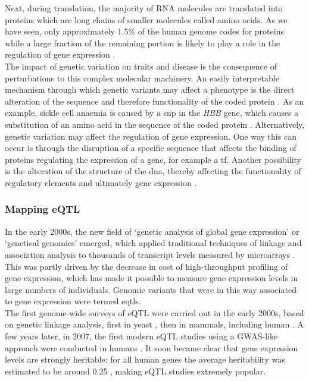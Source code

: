 Next, during translation, the majority of RNA molecules are translated into  proteins 
which are
long chains of smaller molecules called amino acids. 
As we have seen, only approximately 1.5\% of the human genome codes for proteins \cite{lander2001initial} while a large fraction of the remaining portion is likely to play a role in the regulation of gene expression \cite{encode2004encode}. \\

The impact of genetic variation on traits and disease is the consequence of perturbations to this complex molecular machinery.
An easily interpretable mechanism through which genetic variants may affect a phenotype is the direct alteration of the sequence 
and therefore functionality of the coded protein \cite{westra2014genome}. 
As an example, sickle cell anaemia is caused by a \gls{snp} in the \textit{HBB} gene, which causes a substitution of an amino acid in the sequence of the coded protein \cite{laird2010fundamentals}. 
Alternatively, genetic variation may affect the regulation of gene expression. 
One way this can occur is through the disruption of a specific sequence that affects the binding of proteins regulating the expression of a gene, for example a \gls{tf}. 
Another possibility is the alteration of the structure of the \gls{dna}, thereby affecting the functionality of regulatory elements and ultimately gene expression \cite{encode2004encode, kundaje2015integrative}. 

\subsubsection{Mapping eQTL}

In the early 2000s, the new field of `genetic analysis of global gene expression' or `genetical genomics' \cite{jansen2001genetical} emerged, which applied traditional techniques of linkage and association analysis to thousands of transcript levels measured by microarrays \cite{rockman2006genetics}.
This was partly driven by the decrease in cost of high-throughput profiling of gene expression, which has made it possible to measure gene expression levels in large numbers of individuals.
Genomic variants that were in this way associated to gene expression were termed \glspl{eqtl}. \\

The first genome-wide surveys of eQTL were carried out in the early 2000s, based on genetic linkage analysis, first in yeast \cite{brem2002genetic}, then in mammals, including human \cite{schadt2003genetics}. 
A few years later, in 2007, the first modern eQTL studies using a GWAS-like approach were conducted in humans \cite{stranger2007population, dixon2007genome}. 
It soon became clear that gene expression levels are strongly heritable: for all human genes the average heritability was estimated to be around 0.25 \cite{ricano2013mapping, dunham2012integrated, maurano2012systematic, westra2014genome}, making eQTL studies extremely popular.\\

